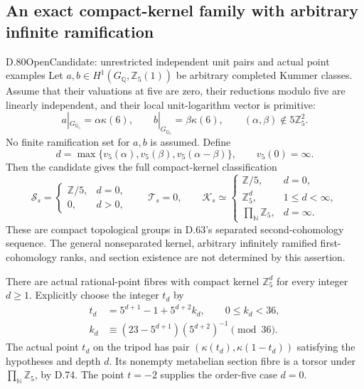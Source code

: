 \subsection{An exact compact-kernel family with arbitrary infinite ramification}

\begin{statement}{D.80}{Open}{Candidate: unrestricted independent unit pairs and actual point examples}
Let \(a,b\in H^1(G_{\mathbb Q},\mathbb Z_5(1))\) be arbitrary
completed Kummer classes. Assume that their valuations at five
are zero, their reductions modulo five are linearly independent,
and their local unit-logarithm vector is primitive:
\[
 a|_{G_{\mathbb Q_5}}=\alpha\kappa(6),\qquad
 b|_{G_{\mathbb Q_5}}=\beta\kappa(6),\qquad
                  (\alpha,\beta)\notin5\mathbb Z_5^2.
                                                               \tag{D.80.1}
\]
No finite ramification set for \(a,b\) is assumed. Define
\[
 d=\max\{v_5(\alpha),v_5(\beta),v_5(\alpha-\beta)\},
                    \qquad v_5(0)=\infty.
                                                               \tag{D.80.2}
\]
Then the candidate gives the full compact-kernel classification
\[
 \mathcal S_s=
 \begin{cases}\mathbb Z/5,&d=0,\\0,&d>0,\end{cases}
 \qquad\mathcal T_s=0,\qquad
 \mathcal K_s\simeq
 \begin{cases}
   \mathbb Z/5,&d=0,\\
   \mathbb Z_5^d,&1\le d<\infty,\\
   \displaystyle\prod_{\mathbb N}\mathbb Z_5,&d=\infty.
 \end{cases}                                                   \tag{D.80.3}
\]
These are compact topological groups in D.63's separated
second-cohomology sequence. The general nonseparated kernel,
arbitrary infinitely ramified first-cohomology ranks, and
section existence are not determined by this assertion.

There are actual rational-point fibres with compact kernel
\(\mathbb Z_5^d\) for every integer \(d\ge1\). Explicitly choose
the integer \(t_d\) by
\[
 \begin{split}
 t_d&=5^{d+1}-1+5^{d+2}k_d,\qquad 0\le k_d<36,\\
 k_d&\equiv(23-5^{d+1})(5^{d+2})^{-1}\pmod{36}.
 \end{split}                                                   \tag{D.80.4}
\]
The actual point \(t_d\) on the tripod has pair
\((\kappa(t_d),\kappa(1-t_d))\) satisfying the hypotheses
and depth \(d\). Its nonempty metabelian section fibre is
a torsor under \(\prod_{\mathbb N}\mathbb Z_5\), by D.74.
The point \(t=-2\) supplies the order-five case \(d=0\).
\end{statement}

